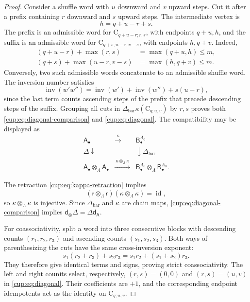 \documentclass[a4paper,11pt,oneside,reqno]{amsart}
\theoremstyle{definition}
\numberwithin{equation}{section}
\begin{document}
\begin{proof}
Consider a shuffle word with $u$ downward and $v$ upward steps.
Cut it after a prefix containing $r$ downward and $s$ upward steps.
The intermediate vertex is
\[
 h=q+u-r+s.
\]
The prefix is an admissible word for
$\mathrm C_{q+u-r;r,s}$, with endpoints $q+u,h$, and the
suffix is an admissible word for
$\mathrm C_{q+s;u-r,v-s}$, with endpoints $h,q+v$.
Indeed,
\[
\begin{aligned}
 (q+u-r)+\max(r,s)&=\max(q+u,h)\leq m,\\
 (q+s)+\max(u-r,v-s)&=\max(h,q+v)\leq m.
\end{aligned}
\]
Conversely, two such admissible words concatenate to an admissible
shuffle word. The inversion number satisfies
\begin{equation}\label{cup:eq:inversion-split}
 \boxed{\operatorname{inv}(w'w'')
 =\operatorname{inv}(w')+\operatorname{inv}(w'')+s(u-r),}
\end{equation}
since the last term counts ascending steps of the prefix that precede
descending steps of the suffix. Grouping all cuts in
$\Delta_{\mathrm{bar}}\kappa(\mathrm C_{q;u,v})$ by $r,s$
proves both \eqref{cup:eq:diagonal-comparison} and
\eqref{cup:eq:diagonal}. The compatibility may be displayed as
\[
\begin{array}{ccc}
 \mathsf A_\bullet &\xrightarrow{\ \kappa\ }&\mathsf B^{\Lambda_0}_\bullet\\[2mm]
 {\scriptstyle\Delta}\downarrow &&\downarrow{\scriptstyle\Delta_{\mathrm{bar}}}\\[2mm]
 \mathsf A_\bullet\otimes_\Lambda\mathsf A_\bullet
 &\xrightarrow{\ \kappa\otimes_\Lambda\kappa\ }&
 \mathsf B^{\Lambda_0}_\bullet\otimes_\Lambda
 \mathsf B^{\Lambda_0}_\bullet.
\end{array}
\]

The retraction \eqref{cup:eq:kappa-retraction} implies
\[
 (\mathsf r\otimes_\Lambda\mathsf r)
 (\kappa\otimes_\Lambda\kappa)=\operatorname{id},
\]
so $\kappa\otimes_\Lambda\kappa$ is injective. Since
$\Delta_{\mathrm{bar}}$ and $\kappa$ are chain maps,
\eqref{cup:eq:diagonal-comparison} implies
$\mathsf d_\otimes\Delta=\Delta\mathsf d_{\mathsf A}$.

For coassociativity, split a word into three consecutive blocks
with descending counts $(r_1,r_2,r_3)$ and ascending counts
$(s_1,s_2,s_3)$. Both ways of parenthesizing the cuts have the same
cross-inversion exponent:
\[
 s_1(r_2+r_3)+s_2r_3
 =s_1r_2+(s_1+s_2)r_3.
\]
They therefore give identical terms and signs, proving strict
coassociativity. The left and right counits select, respectively,
$(r,s)=(0,0)$ and $(r,s)=(u,v)$ in \eqref{cup:eq:diagonal}.
Their coefficients are $+1$, and the corresponding endpoint
idempotents act as the identity on $\mathrm C_{q;u,v}$.
\end{proof}
\end{document}
